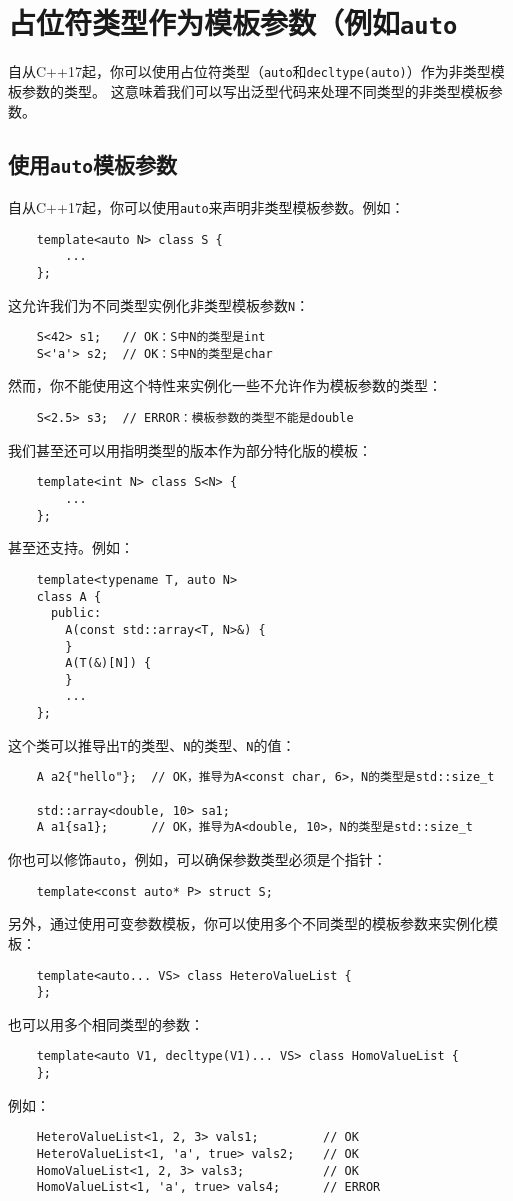 \section{占位符类型作为模板参数（例如\texttt{auto}}\label{ch13}
自从C++17起，你可以使用占位符类型（\texttt{auto}和\texttt{decltype(auto)}）作为非类型模板参数的类型。
这意味着我们可以写出泛型代码来处理不同类型的非类型模板参数。

\subsection{使用\texttt{auto}模板参数}\label{ch13.1}
自从C++17起，你可以使用\texttt{auto}来声明非类型模板参数。例如：
\begin{lstlisting}
    template<auto N> class S {
        ...
    };
\end{lstlisting}
这允许我们为不同类型实例化非类型模板参数\texttt{N}：
\begin{lstlisting}
    S<42> s1;   // OK：S中N的类型是int
    S<'a'> s2;  // OK：S中N的类型是char
\end{lstlisting}
然而，你不能使用这个特性来实例化一些不允许作为模板参数的类型：
\begin{lstlisting}
    S<2.5> s3;  // ERROR：模板参数的类型不能是double
\end{lstlisting}
我们甚至还可以用指明类型的版本作为部分特化版的模板：
\begin{lstlisting}
    template<int N> class S<N> {
        ...
    };
\end{lstlisting}
甚至还支持。例如：
\begin{lstlisting}
    template<typename T, auto N>
    class A {
      public:
        A(const std::array<T, N>&) {
        }
        A(T(&)[N]) {
        }
        ...
    };
\end{lstlisting}
这个类可以推导出\texttt{T}的类型、\texttt{N}的类型、\texttt{N}的值：
\begin{lstlisting}
    A a2{"hello"};  // OK，推导为A<const char, 6>，N的类型是std::size_t

    std::array<double, 10> sa1;
    A a1{sa1};      // OK，推导为A<double, 10>，N的类型是std::size_t
\end{lstlisting}
你也可以修饰\texttt{auto}，例如，可以确保参数类型必须是个指针：
\begin{lstlisting}
    template<const auto* P> struct S;
\end{lstlisting}
另外，通过使用可变参数模板，你可以使用多个不同类型的模板参数来实例化模板：
\begin{lstlisting}
    template<auto... VS> class HeteroValueList {
    };
\end{lstlisting}
也可以用多个相同类型的参数：
\begin{lstlisting}
    template<auto V1, decltype(V1)... VS> class HomoValueList {
    };
\end{lstlisting}
例如：
\begin{lstlisting}
    HeteroValueList<1, 2, 3> vals1;         // OK
    HeteroValueList<1, 'a', true> vals2;    // OK
    HomoValueList<1, 2, 3> vals3;           // OK
    HomoValueList<1, 'a', true> vals4;      // ERROR
\end{lstlisting}

